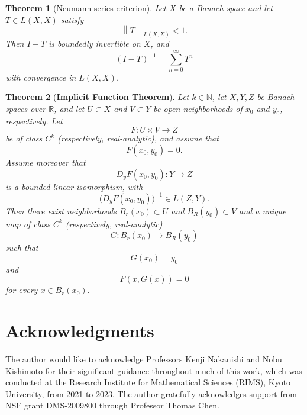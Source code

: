 \documentclass[12pt,oneside,reqno]{amsart}
\numberwithin{equation}{section}
\theoremstyle{plain}
\newtheorem{theorem}{Theorem}[section]
\def\N{{\mathbb N}}
\def\R{{\mathbb R}}
\newcommand{\norm}[1]{%
    \left\lVert #1\right\rVert%
}
\begin{document}
\begin{theorem}[Neumann-series criterion]
\label{Invertibility}
Let $X$ be a Banach space and let $T\in L(X,X)$ satisfy
\begin{equation}
    \norm{T}_{L(X,X)}<1.
\end{equation}
Then $I-T$ is boundedly invertible on $X$, and
\begin{equation}
    (I-T)^{-1}
    =
    \sum_{n=0}^{\infty}T^n
\end{equation}
with convergence in $L(X,X)$.
\end{theorem}
\begin{theorem}[\textbf{Implicit Function Theorem}]
\label{ImplicitFunctionTheorem}
Let $k\in\N$, let $X,Y,Z$ be Banach spaces over $\R$, and let
$U\subset X$ and $V\subset Y$ be open neighborhoods of $x_0$ and
$y_0$, respectively. Let
\begin{equation}
    F:U\times V\to Z
\end{equation}
be of class $C^k$ (respectively, real-analytic), and assume that
\begin{equation}
    F(x_0,y_0)=0.
\end{equation}
Assume moreover that
\begin{equation}
    D_yF(x_0,y_0):Y\to Z
\end{equation}
is a bounded linear isomorphism, with
\begin{equation}
    \big(D_yF(x_0,y_0)\big)^{-1}\in L(Z,Y).
\end{equation}
Then there exist neighborhoods $B_r(x_0)\subset U$ and
$B_R(y_0)\subset V$ and a unique map of class $C^k$ (respectively,
real-analytic)
\begin{equation}
    G:B_r(x_0)\to B_R(y_0)
\end{equation}
such that
\begin{equation}
    G(x_0)=y_0
\end{equation}
and
\begin{equation}
    F(x,G(x))=0
\end{equation}
for every $x\in B_r(x_0)$.
\end{theorem}

  \bigskip

\section*{Acknowledgments}
\noindent
The author would like to acknowledge Professors Kenji Nakanishi and Nobu Kishimoto for their significant guidance throughout much of this work, which was conducted at the Research Institute for Mathematical Sciences (RIMS), Kyoto University, from 2021 to 2023. The author gratefully acknowledges support from NSF grant DMS-2009800 through Professor Thomas Chen.



%
%
%
%

\end{document}
